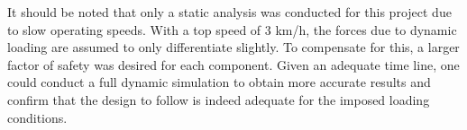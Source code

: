 It should be noted that only a static analysis was conducted for this project due to slow operating speeds. With a top speed of 3 km/h, the forces due to dynamic loading are assumed to only differentiate slightly. To compensate for this, a larger factor of safety was desired for each component. Given an adequate time line, one could conduct a full dynamic simulation to obtain more accurate results and confirm that the design to follow is indeed adequate for the imposed loading conditions. 







